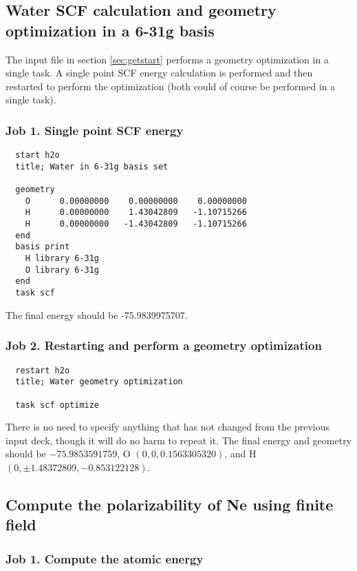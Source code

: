 \label{sec:sample}
\subsection{Water SCF calculation and geometry optimization in a 6-31g basis}
\label{sec:sample1}

The input file in section \ref{sec:getstart} performs a geometry optimization
in a single task. A single point SCF energy calculation is performed and then
restarted to perform the optimization (both could of course be
performed in a single task).

\subsubsection{Job 1.  Single point SCF energy}

\begin{verbatim}
  start h2o
  title; Water in 6-31g basis set

  geometry
    O      0.00000000    0.00000000    0.00000000
    H      0.00000000    1.43042809   -1.10715266
    H      0.00000000   -1.43042809   -1.10715266
  end
  basis print
    H library 6-31g
    O library 6-31g
  end
  task scf
\end{verbatim}

The final energy should be -75.9839975707.

\subsubsection{Job 2. Restarting and perform a geometry optimization}

\begin{verbatim}
  restart h2o
  title; Water geometry optimization

  task scf optimize
\end{verbatim}

There is no need to specify anything that has not changed from the
previous input deck, though it will do no harm to repeat it.  The
final energy and geometry should be $-75.9853591759$, O
$(0,0,0.1563305320)$, and H $(0, \pm1.48372809, -0.853122128)$.

\subsection{Compute the polarizability of Ne using finite field}
\label{sec:sample2}

\subsubsection{Job 1. Compute the atomic energy}

